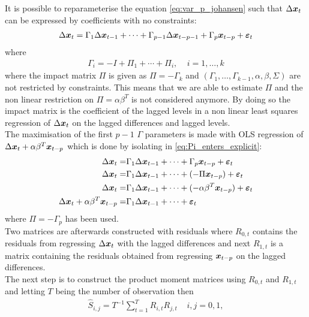 \noindent It is possible to reparameterise the equation \eqref{eq:var_p_johansen} such that $\Delta \boldsymbol{x}_t$ can be expressed by coefficients with no constraints:
\begin{align}\label{eq:Pi_enters_explicit}
    \Delta \boldsymbol{x}_t=\Gamma_1\Delta \boldsymbol{x}_{t-1}+\cdots+\Gamma_{p-1}\Delta \boldsymbol{x}_{t-p-1}+\Gamma_{p}\boldsymbol{x}_{t-p}+\boldsymbol{\varepsilon}_t
\end{align}
where 
\begin{align*}
    \Gamma_i=-I+\Pi_1+\cdots+\Pi_i,\;\;\;\; i=1,\ldots,k
\end{align*}
where the impact matrix $\Pi$ is given as $\Pi=-\Gamma_k$ and $(\Gamma_1,\ldots,\Gamma_{k-1},\alpha,\beta,\Sigma)$ are not restricted by constraints. This means that we are able to estimate $\Pi$ and the non linear restriction on $\Pi=\alpha\beta^T$ is not considered anymore. By doing so the impact matrix is the coefficient of the lagged levels in a non linear least squares regression of $\Delta \boldsymbol{x}_t$ on the lagged differences and lagged levels.\\
\noindent The maximisation of the first $p-1$ $\Gamma$ parameters is made with OLS regression of $\Delta \boldsymbol{x}_t+\alpha\beta^T \boldsymbol{x}_{t-p}$ which is done by isolating in \eqref{eq:Pi_enters_explicit}:
\begin{align}
    \Delta \boldsymbol{x}_t=&\Gamma_1\Delta \boldsymbol{x}_{t-1}+\cdots+\Gamma_{p}\boldsymbol{x}_{t-p}+\boldsymbol{\varepsilon}_t\\
    \Delta \boldsymbol{x}_t=&\Gamma_1\Delta \boldsymbol{x}_{t-1}+\cdots+(-\Pi \boldsymbol{x}_{t-p})+\boldsymbol{\varepsilon}_t\\
    \Delta \boldsymbol{x}_t=&\Gamma_1\Delta \boldsymbol{x}_{t-1}+\cdots+(-\alpha\beta^T \boldsymbol{x}_{t-p})+\boldsymbol{\varepsilon}_t\\
    \Delta \boldsymbol{x}_t+\alpha\beta^T \boldsymbol{x}_{t-p}=&\Gamma_1\Delta \boldsymbol{x}_{t-1}+\cdots+\boldsymbol{\varepsilon}_t
\end{align}
where $\Pi=-\Gamma_p$ has been used.\\
Two matrices are afterwards constructed with residuals where $R_{0,t}$ contains the residuals from regressing $\Delta \boldsymbol{x}_t$ with the lagged differences and next $R_{1,t}$ is a matrix containing the residuals obtained from regressing $\boldsymbol{x}_{t-p}$ on the lagged differences.\\
The next step is to construct the product moment matrices using $R_{0,t}$ and $R_{1,t}$ and letting $T$ being the number of observation then
\begin{align}\label{eq:prod_mom_mat}
\hat{S}_{i,j}=T^{-1}\sum_{t=1}^T R_{i,t}R_{j,t}\;\;\;\; i,j=0,1,
\end{align}

